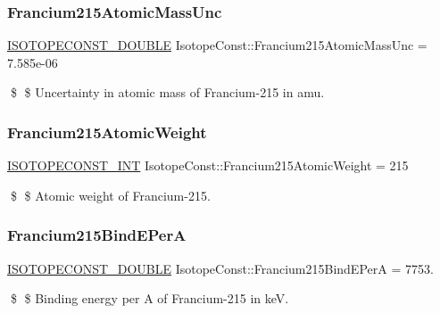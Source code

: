 \subsubsection{\texorpdfstring{Francium215\+Atomic\+Mass\+Unc}{Francium215AtomicMassUnc}}
{\footnotesize\ttfamily \mbox{\hyperlink{group___isotope_const-_macros_ga8f45a7272ce02c0b4c65c44636ed719a}{I\+S\+O\+T\+O\+P\+E\+C\+O\+N\+S\+T\+\_\+\+D\+O\+U\+B\+LE}} Isotope\+Const\+::\+Francium215\+Atomic\+Mass\+Unc = 7.\+585e-\/06}

\$ \$ Uncertainty in atomic mass of Francium-\/215 in amu. \mbox{\label{group___isotope_const-_francium-_fr215_ga0632d05c0218efab19285fabaf8dc520}} 
\subsubsection{\texorpdfstring{Francium215\+Atomic\+Weight}{Francium215AtomicWeight}}
{\footnotesize\ttfamily \mbox{\hyperlink{group___isotope_const-_macros_ga5f18360b3e99483a35c32d789e62621c}{I\+S\+O\+T\+O\+P\+E\+C\+O\+N\+S\+T\+\_\+\+I\+NT}} Isotope\+Const\+::\+Francium215\+Atomic\+Weight = 215}

\$ \$ Atomic weight of Francium-\/215. \mbox{\label{group___isotope_const-_francium-_fr215_ga719eca53131603ffa9619beffc14035a}} 
\subsubsection{\texorpdfstring{Francium215\+Bind\+E\+PerA}{Francium215BindEPerA}}
{\footnotesize\ttfamily \mbox{\hyperlink{group___isotope_const-_macros_ga8f45a7272ce02c0b4c65c44636ed719a}{I\+S\+O\+T\+O\+P\+E\+C\+O\+N\+S\+T\+\_\+\+D\+O\+U\+B\+LE}} Isotope\+Const\+::\+Francium215\+Bind\+E\+PerA = 7753.}

\$ \$ Binding energy per A of Francium-\/215 in keV. \mbox{\label{group___isotope_const-_francium-_fr215_ga28d0c729a8f4d07c202fb6838a1dac27}} 
